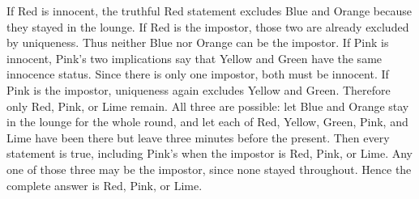 If Red is innocent, the truthful Red statement excludes Blue and Orange because they stayed in the lounge. If Red is the impostor, those two are already excluded by uniqueness. Thus neither Blue nor Orange can be the impostor. If Pink is innocent, Pink's two implications say that Yellow and Green have the same innocence status. Since there is only one impostor, both must be innocent. If Pink is the impostor, uniqueness again excludes Yellow and Green. Therefore only Red, Pink, or Lime remain. All three are possible: let Blue and Orange stay in the lounge for the whole round, and let each of Red, Yellow, Green, Pink, and Lime have been there but leave three minutes before the present. Then every statement is true, including Pink's when the impostor is Red, Pink, or Lime. Any one of those three may be the impostor, since none stayed throughout. Hence the complete answer is $\boxed{\text{Red, Pink, or Lime}}$.
